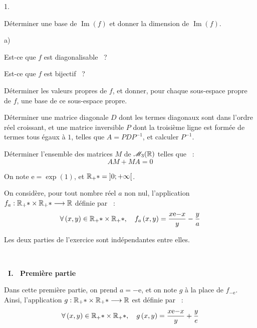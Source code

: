 \documentclass[11pt]{article}%
\begin{document}
\begin{noliste}{1.}
 \setlength{\itemsep}{4mm}
\item Déterminer une base de $\operatorname{Im}\left( {f}\right) $ et
donner la
dimension de $\operatorname{Im}\left( {f}\right) $.

\item 
\begin{noliste}{a)}
 \setlength{\itemsep}{2mm}
\item Est-ce que $f$ est diagonalisable~ ?

\item Est-ce que $f$ est bijectif~ ?
\end{noliste}

\item Déterminer les valeurs propres de $f$, et donner, pour chaque
sous-espace propre de $f$, une base de ce sous-espace propre.

\item Déterminer une matrice diagonale $D$ dont les termes diagonaux
sont dans l'ordre réel croissant, et une matrice inversible $P$ dont la
troisième ligne est formée de termes tous égaux à $1$,
telles que $A = PDP^{-1}$, et calculer $P^{-1}$.

\item Déterminer l'ensemble des matrices $M$ de $\mathscr{M}_{3}(\mathbb{R}) $ telles que~ : 
\[
AM + MA = 0
\]
\end{noliste}

\begin{center}
\vspace{1.5cm}{\LARG\E\ \noindent EXERCICE~2}
\end{center}

On note $\text{e} = \exp \left( {1}\right) $, et $\Bbb{R}_{+}{*} =
\left] {0; + \infty }\right[ $.

On considère, pour tout nombre réel $a$ non nul, l'application $f_{a}
:\Bbb{R}_{+}{*}\times \Bbb{R}_{+}{*}\longrightarrow \Bbb{R}$
définie par~ : 
\[
\forall \left( {x,y}\right) \in \Bbb{R}_{+}{*}\times
\Bbb{R}_{+}{*},\quad f_{a}\left( {x,y}\right) =
\dfrac{x\mathrm{e}{-x}}{y}-\dfrac{y}{a} 
\]

Les deux parties de l'exercice sont indépendantes entre elles.

~

\textbf{\ \noindent I.~ Première partie}

Dans cette première partie, on prend $a = -\mathrm{e}$, et on note $g$
à la place de $f_{-\text{e}}$. Ainsi, l'application $g
:\Bbb{R}_{+}{*}\times \Bbb{R}_{+}{*}\longrightarrow \Bbb{R}$ est
définie
par~ : 
\[
\forall \left( {x,y}\right) \in \Bbb{R}_{+}{*}\times
\Bbb{R}_{+}{*},\quad g\left( {x,y}\right) = \dfrac{x\mathrm{e}{-x}}{y}
+ \dfrac{y}{e}
\]
\end{document}
